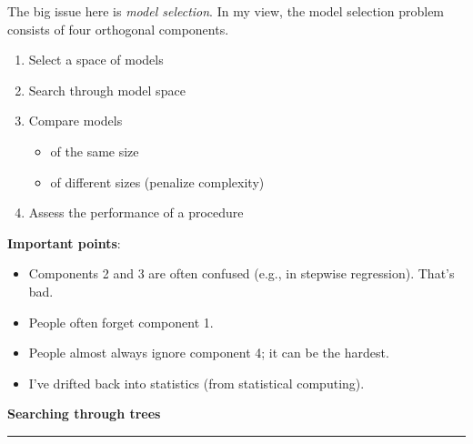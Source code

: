 \documentclass[12pt,letterpaper]{article}
\newcommand{\HRule}{\rule{\linewidth}{4pt}}
\newcommand{\vsphalf}{\vspace*{0.5cm}}
\begin{document}
\vsphalf

\fontsize{20}{25} \selectfont

The big issue here is \emph{model selection}.  In my view, the model
selection problem consists of four orthogonal components.

\begin{enumerate}

\item Select a space of models

\item Search through model space

\item Compare models
  \begin{itemize}
    \item of the same size
    \item of different sizes (penalize complexity)
  \end{itemize}

\item Assess the performance of a procedure

\end{enumerate}

\vsphalf

\textbf{Important points}:
\begin{itemize}
\item Components 2 and 3 are often confused (e.g., in
  stepwise regression).  That's bad.  

\item People often forget component 1.
  
\item People almost always ignore component 4; it can be the hardest.

\item I've drifted back into statistics (from statistical computing).

\end{itemize} 





\newpage

\fontsize{30}{30} \selectfont

\centerline{\textbf{Searching through trees}}

\HRule

\vsphalf

\fontsize{20}{25} \selectfont
\end{document}
